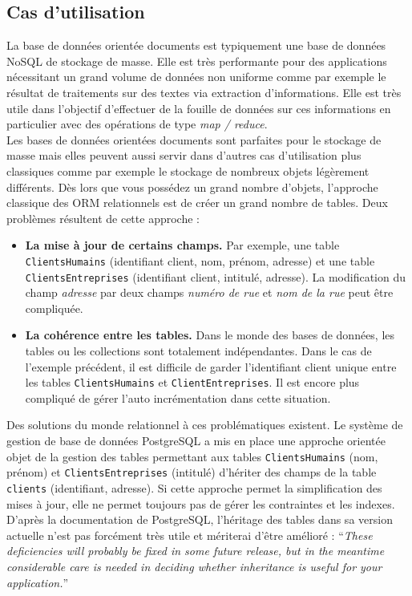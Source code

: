 \subsection{Cas d'utilisation}

	La base de données orientée documents est typiquement une base de données NoSQL de stockage de masse. Elle est très performante pour des applications nécessitant un grand volume de données non uniforme comme par exemple le résultat de traitements sur des textes via extraction d'informations. Elle est très utile dans l'objectif d'effectuer de la fouille de données sur ces informations en particulier avec des opérations de type \textit{map / reduce}.\\

	Les bases de données orientées documents sont parfaites pour le stockage de masse mais elles peuvent aussi servir dans d'autres cas d'utilisation plus classiques comme par exemple le stockage de nombreux objets légèrement différents. Dès lors que vous possédez un grand nombre d'objets, l'approche classique des ORM relationnels est de créer un grand nombre de tables. Deux problèmes résultent de cette approche : \\
	\begin{itemize}
		\item \textbf{La mise à jour de certains champs.} Par exemple, une table \texttt{ClientsHumains} (identifiant client, nom, prénom, adresse) et une table \texttt{ClientsEntreprises} (identifiant client, intitulé, adresse). La modification du champ \textit{adresse} par deux champs \textit{numéro de rue} et \textit{nom de la rue} peut être compliquée.
		\item \textbf{La cohérence entre les tables.} Dans le monde des bases de données, les tables ou les collections sont totalement indépendantes. Dans le cas de l'exemple précédent, il est difficile de garder l'identifiant client unique entre les tables \texttt{ClientsHumains} et \texttt{ClientEntreprises}. Il est encore plus compliqué de gérer l'auto incrémentation dans cette situation.
	\end{itemize}

	\vspace{10px}

	Des solutions du monde relationnel à ces problématiques existent. Le système de gestion de base de données PostgreSQL a mis en place une approche orientée objet de la gestion des tables permettant aux tables \texttt{ClientsHumains} (nom, prénom) et \texttt{ClientsEntreprises} (intitulé) d'hériter des champs de la table \texttt{clients} (identifiant, adresse). Si cette approche permet la simplification des mises à jour, elle ne permet toujours pas de gérer les contraintes et les indexes. D'après la documentation de PostgreSQL, l'héritage des tables dans sa version actuelle n'est pas forcément très utile et mériterai d'être amélioré :
	\enquote{\textit{These deficiencies will probably be fixed in some future release, but in the meantime considerable care is needed in deciding whether inheritance is useful for your application.}}\cite{Postgre_inheritance}\\

